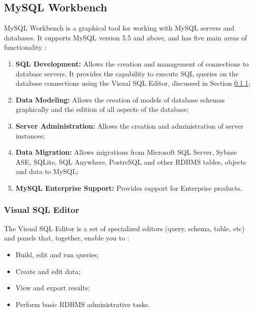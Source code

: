\documentclass[12pt]{article}
\begin{document}
\subsection{MySQL Workbench}
\label{workbench}
MySQL Workbench is a graphical tool for working with MySQL servers and databases. It supports MySQL version 5.5 and above, and has five main areas of functionality \parencite{workbench}:
\begin{enumerate}
    \item \textbf{SQL Development:} Allows the creation and management of connections to database servers. It provides the capability to execute SQL queries on the database connections using the Visual SQL Editor, discussed in Section \ref{visualSQLEditor};
    
    \item \textbf{Data Modeling:} Allows the creation of models of database schemas graphically and the edition of all aspects of the database;
    
    \item \textbf{Server Administration:} Allows the creation and administration of server instances;

    \item \textbf{Data Migration:} Allows migrations from Microsoft SQL Server, Sybase ASE, SQLite, SQL Anywhere, PostreSQL and other RDBMS tables, objects and data to MySQL;
    
    \item \textbf{MySQL Enterprise Support:} Provides support for Enterprise products.

\end{enumerate}


\subsubsection{Visual SQL Editor}
\label{visualSQLEditor}
The Visual SQL Editor is a set of specialized editors (query, schema, table, etc) and panels that, together, enable you to \parencite{visualSQLEditor}: 

\begin{itemize}
    \item Build, edit and run queries;
    \item Create and edit data;
    \item View and export results;
    \item Perform basic RDBMS administrative tasks.
\end{itemize}
\end{document}
